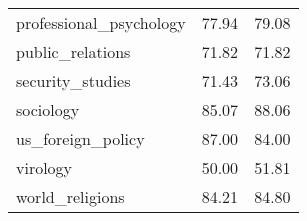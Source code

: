 \begin{table}[t]
\begin{tabular}{L{0.35}C{0.20}C{0.20}}
        professional\_psychology                & 77.94                    & 79.08                      \\
        public\_relations                       & 71.82                    & 71.82                      \\
        security\_studies                       & 71.43                    & 73.06                      \\
        sociology                               & 85.07                    & 88.06                      \\
        us\_foreign\_policy                     & 87.00                    & 84.00                      \\
        virology                                & 50.00                    & 51.81                      \\
        world\_religions                        & 84.21                    & 84.80                      \\
        \bottomrule
    \end{tabular}
\end{table}
\endgroup